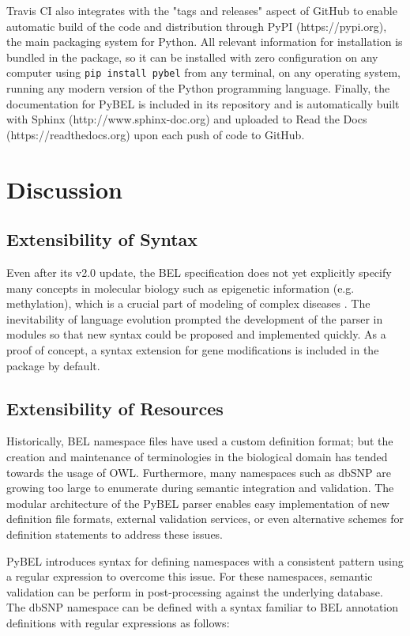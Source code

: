 Travis CI also integrates with the "tags and releases" aspect of GitHub to enable automatic build of the code and distribution through PyPI (https://pypi.org), the main packaging system for Python. All relevant information for installation is bundled in the package, so it can be installed with zero configuration on any computer using \verb|pip install pybel| from any terminal, on any operating system, running any modern version of the Python programming language. Finally, the documentation for PyBEL is included in its repository and is automatically built with Sphinx (http://www.sphinx-doc.org) and uploaded to Read the Docs (https://readthedocs.org) upon each push of code to GitHub.

\section{Discussion}

\subsection{Extensibility of Syntax}

Even after its v2.0 update, the \ac{BEL} specification does not yet explicitly specify many concepts in molecular biology such as epigenetic information (e.g. methylation), which is a crucial part of modeling of complex diseases \cite{Irin2015}. The inevitability of language evolution prompted the development of the parser in modules so that new syntax could be proposed and implemented quickly. As a proof of concept, a syntax extension for gene modifications is included in the package by default.

\subsection{Extensibility of Resources}
Historically, \ac{BEL} namespace files have used a custom definition format; but the creation and maintenance of terminologies in the biological domain has tended towards the usage of \ac{OWL}. Furthermore, many namespaces such as dbSNP \cite{Sherry2001} are growing too large to enumerate during semantic integration and validation. The modular architecture of the PyBEL parser enables easy implementation of new definition file formats, external validation services, or even alternative schemes for definition statements to address these issues.

PyBEL introduces syntax for defining namespaces with a consistent pattern using a regular expression to overcome this issue. For these namespaces, semantic validation can be perform in post-processing against the underlying database. The dbSNP namespace can be defined with a syntax familiar to BEL annotation definitions with regular expressions as follows:

